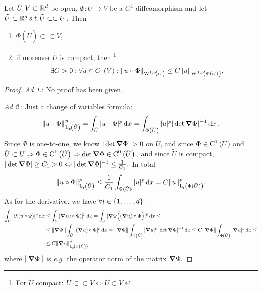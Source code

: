 \documentclass{article}
\begin{document}
\begin{lemma}
	Let $U,V \subset {\mathbb R}^d$ be open, $\Phi: U \to V$ be a $C^1$ diffeomorphism and let $\tilde{U} \subset {\mathbb R}^{d}\, \text{\textit{s.t.}} \, \tilde{U} \subset \subset U$. Then
	\begin{enumerate}
		\item $\Phi(\tilde{U}) \subset \subset V,$
		\item if moreover $\tilde{U}$ is compact, then \footnote{For $\tilde{U}$ compact: $\tilde{U} \subset \subset V \Leftrightarrow \tilde{U} \subset V$.} 
			\[
				\exists C>0: \forall u \in C^1\qty(V): \norm{u \circ \Phi}_{\WkpSet[1][p]{\tilde{U}}} \leq C \norm{u}_{\WkpSet[1][p]{\Phi(\tilde{U})}}.
			\]
	\end{enumerate}
\end{lemma}

\begin{proof}

	\textit{Ad 1.}: No proof has been given.


	\textit{Ad 2.}: Just a change of variables formula:
	\[
		\norm{u \circ \Phi}_{\LpSet{\tilde{U}}}^p = \int_{\tilde{U}}|u \circ \Phi|^p\dd{x} = \int_{\Phi\qty(\tilde{U})}|u|^p | \det \grad \Phi|^{-1}\dd{x}.
	\]
	Since $\Phi$ is one-to-one, we know $|\det \grad \Phi| >0$ on $U$, and since $\Phi \in \text{C}^{1}\!\,\left(U \right)$ and $\tilde{U} \subset U \Rightarrow \Phi \in \text{C}^{1}\!\,\left(\tilde{U} \right) \Rightarrow \det \grad \Phi \in \text{C}^{0}\!\,\left(\tilde{U} \right),$ and since $\tilde{U}$ is compact, $|\det \grad \Phi| \geq C_1 > 0 \Leftrightarrow |\det \grad \Phi|^{-1}\leq \frac{1}{C_1}.$ In total	
	\[
		\norm{u \circ \Phi}_{\LpSet{\tilde{U}}}^p \leq \frac{1}{C_1} \int_{\Phi(\tilde{U})}|u|^p\dd{x} = C\norm{u}_{\LpSet{\Phi(\tilde{U})}}^p.
	\]
	As for the derivative, we have $\forall i \in \qty{1,\dots,d}:$
	\begin{align*}
		\int_{\tilde{U}}|\partial_{i}(u \circ \Phi)|^p\dd{x} &\leq \int_{\tilde{U}}|\grad (u \circ \Phi)|^p\dd{x} = \int_{\tilde{U}}| \grad \Phi \Big(\qty(\grad u)\circ \Phi\Big)|^p\dd{x}\leq \\
									 &\leq \norm{\grad \Phi} \int_{\tilde{U}}|(\grad u) \circ \Phi|^p\dd{x} = \norm{\grad \Phi} \int_{\Phi\qty(\tilde{U})}|\grad u|^p |\det \grad \Phi|^{-1}\dd{x} \leq C\norm{\grad \Phi} \int_{\Phi\qty(\tilde{U})}|\grad u|^p\dd{x} \leq \\
										 &\leq C \norm{\grad u}_{\LpSet[p]{\Phi\qty(\tilde{U})}}^p,
	\end{align*}
	where $\norm{\grad \Phi}$ is \textit{e.g.} the operator norm of the matrix $\grad \Phi.$
\end{proof}
\end{document}
